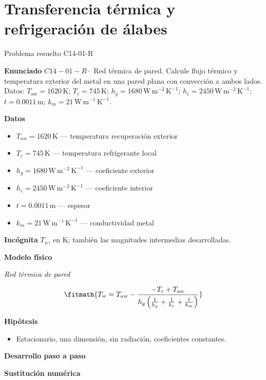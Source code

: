 \documentclass[10pt,openany]{book}
\begin{document}
\chapter{Transferencia térmica y refrigeración de álabes}
\begin{studiumworked}{Problema resuelto C14-01-R}


\noindent\textbf{Enunciado}
\(C14-01-R \cdot\) Red térmica de pared. Calcule flujo térmico y temperatura exterior del metal en una pared plana con convección a ambos lados. Datos: \(T_{aw}=1620\, \mathrm{K}\); \(T_c=745\, \mathrm{K}\); \(h_g=1680\, \mathrm{W}\,\mathrm{m}^{-2}\,\mathrm{K}^{-1}\); \(h_c=2450\, \mathrm{W}\,\mathrm{m}^{-2}\,\mathrm{K}^{-1}\); \(t=0.0011\, \mathrm{m}\); \(k_m=21\, \mathrm{W}\,\mathrm{m}^{-1}\,\mathrm{K}^{-1}\).

\noindent\textbf{Datos}
\begin{itemize}
\item $T_{aw} = 1620\,\mathrm{K}$ — temperatura recuperación exterior
\item $T_c = 745\,\mathrm{K}$ — temperatura refrigerante local
\item $h_g = 1680\,\mathrm{W}\,\mathrm{m}^{-2}\,\mathrm{K}^{-1}$ — coeficiente exterior
\item $h_c = 2450\,\mathrm{W}\,\mathrm{m}^{-2}\,\mathrm{K}^{-1}$ — coeficiente interior
\item $t = 0.0011\,\mathrm{m}$ — espesor
\item $k_m = 21\,\mathrm{W}\,\mathrm{m}^{-1}\,\mathrm{K}^{-1}$ — conductividad metal
\end{itemize}

\noindent\textbf{Incógnita}
$T_w$, en $\mathrm{K}$; también las magnitudes intermedias desarrolladas.

\noindent\textbf{Modelo físico}

\noindent\textit{Red térmica de pared}

\[
\fitmath{T_w=T_{aw} - \frac{- T_c + T_{aw}}{h_g \left(\frac{1}{h_g} + \frac{1}{h_c} + \frac{t}{k_m}\right)}}
\]

\noindent\textbf{Hipótesis}
\begin{itemize}
\item Estacionario, una dimensión, sin radiación, coeficientes constantes.
\end{itemize}

\noindent\textbf{Desarrollo paso a paso}



\noindent\textbf{Sustitución numérica}


\end{studiumworked}
\end{document}
